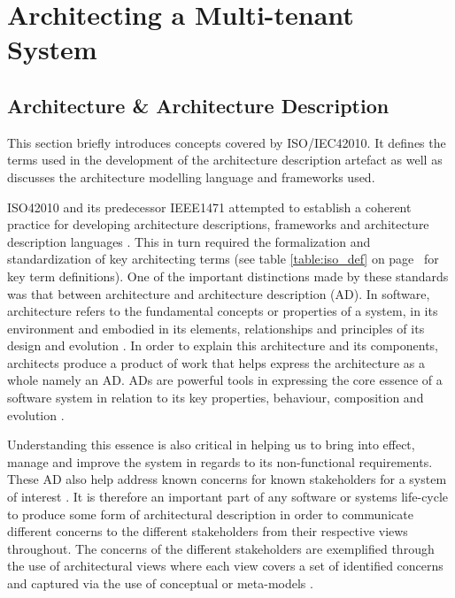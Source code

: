 \chapter{Architecting a Multi-tenant System}
\label{chapter:architecting}
\section{Architecture \& Architecture Description} 
This section briefly introduces concepts covered by ISO/IEC42010. It defines the terms used in the development of the architecture description artefact as well as discusses the architecture modelling language and frameworks used.


ISO42010 and its predecessor IEEE1471 attempted to establish a coherent practice for developing architecture descriptions, frameworks and architecture description languages \cite{InternationalOrganizationOfStandardization2011}. This in turn required the formalization and standardization of key architecting terms (see table \ref{table:iso_def} on page~\pageref{table:iso_def} for key term definitions). One of the important distinctions made by these standards was that between architecture and architecture description (AD). In software, architecture refers to the fundamental concepts or properties of a system, in its environment and embodied in its elements, relationships and principles of its design and evolution \cite{InternationalOrganizationOfStandardization2011}. In order to explain this architecture and its components, architects produce a product of work that helps express the architecture as a whole namely an AD. ADs are powerful tools in expressing the core essence of a software system in relation to its key properties, behaviour, composition and evolution \cite{InternationalOrganizationOfStandardization2011}. 

Understanding this essence is also critical in helping us to bring into effect, manage and improve the system in regards to its non-functional requirements. These AD also help address known concerns for known stakeholders for a system of interest \cite{Emery2009}. It is therefore an important part of any software or systems life-cycle to produce some form of architectural description in order to communicate different concerns to the different stakeholders from their respective views throughout. The concerns of the different stakeholders are exemplified through the use of architectural views where each view covers a set of identified concerns and captured via the use of conceptual or meta-models \cite{42010faq}.


